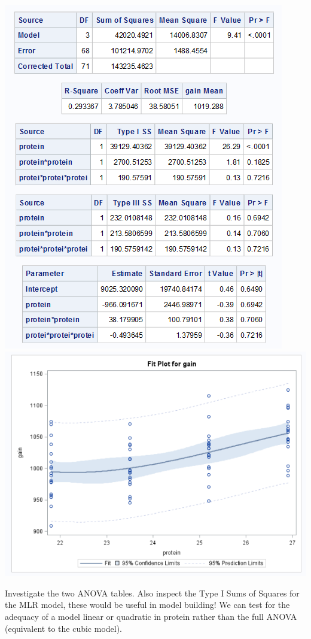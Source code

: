 \begin{center}
\includegraphics[scale=0.8]{ChickensGLM2}\includegraphics[scale=0.5]{ChickensScatter}
\end{center}

Investigate the two ANOVA tables.  Also inspect the Type I Sums of Squares for the MLR model, these would be useful in model building!  We can test for the adequacy of a model linear or quadratic in protein rather than the full ANOVA (equivalent to the cubic model).\\~\\

